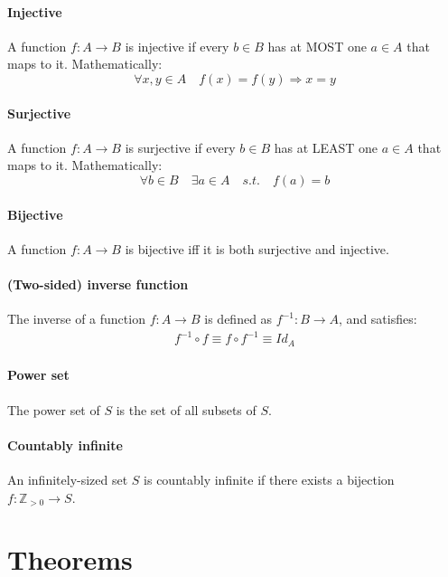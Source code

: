 \documentclass{scrartcl}
\newcommand{\Z}{\mathbb{Z}}
\begin{document}
\paragraph{Injective}
A function $ f : A \to B $ is injective if every $ b \in B $ has at MOST one $ a \in A $ that maps to it. Mathematically:
\begin{equation}
\forall x, y \in A \quad f(x) = f(y) \Rightarrow x = y
\end{equation}

\paragraph{Surjective}
A function $ f : A \to B $ is surjective if every $ b \in B $ has at LEAST one $ a \in A $ that maps to it. Mathematically:
\begin{equation}
\forall b \in B \quad \exists a \in A \quad s.t. \quad f(a) = b
\end{equation}

\paragraph{Bijective}
A function $ f : A \to B $ is bijective iff it is both surjective and injective.

\paragraph{(Two-sided) inverse function}
The inverse of a function $ f : A \to B $ is defined as $ f^{-1} : B \to A $, and satisfies:
\begin{align}
f^{-1} \circ f \equiv f \circ f^{-1} \equiv Id_{A}
\end{align}

\paragraph{Power set}
The power set of $ S $ is the set of all subsets of $ S $.

\paragraph{Countably infinite}
An infinitely-sized set $ S $ is countably infinite if there exists a bijection $ f : \Z_{> 0} \to S $.

\section{Theorems}
\end{document}
